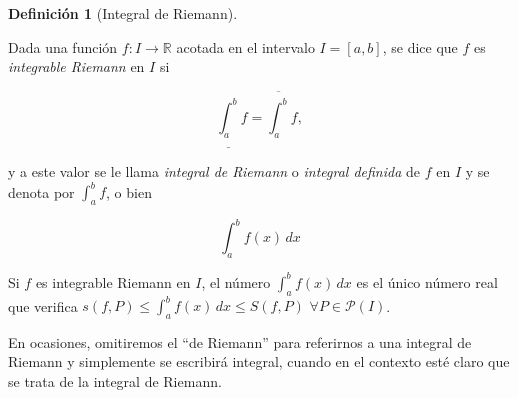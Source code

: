 \documentclass[
  a4paper,
]{scrreport}
\theoremstyle{definition}
\theoremstyle{plain}
\theoremstyle{definition}
\newtheorem{definition}{Definición}[chapter]
\theoremstyle{definition}
\theoremstyle{plain}
\theoremstyle{plain}
\theoremstyle{remark}
\begin{document}
\begin{definition}[Integral de
Riemann]\protect\hypertarget{def-integral-riemann}{}\label{def-integral-riemann}

Dada una función \(f:I\to\mathbb{R}\) acotada en el intervalo
\(I=[a,b]\), se dice que \(f\) es \emph{integrable Riemann} en \(I\) si

\[
\underline{\int_a^b} f = \overline{\int_a^b}f,
\]

y a este valor se le llama \emph{integral de Riemann} o \emph{integral
definida} de \(f\) en \(I\) y se denota por \(\int_a^b f\), o bien

\[
\int_a^b f(x)\,dx
\]

\end{definition}

\begin{tcolorbox}[enhanced jigsaw, leftrule=.75mm, colbacktitle=quarto-callout-note-color!10!white, toprule=.15mm, opacityback=0, opacitybacktitle=0.6, toptitle=1mm, breakable, bottomtitle=1mm, colframe=quarto-callout-note-color-frame, rightrule=.15mm, titlerule=0mm, title=\textcolor{quarto-callout-note-color}{\faInfo}\hspace{0.5em}{Nota}, arc=.35mm, left=2mm, bottomrule=.15mm, colback=white, coltitle=black]

Si \(f\) es integrable Riemann en \(I\), el número \(\int_a^b f(x)\,dx\)
es el único número real que verifica
\(s(f,P)\leq \int_a^b f(x)\,dx\leq S(f,P)\)
\(\forall P\in\mathcal{P}(I)\).

\end{tcolorbox}

En ocasiones, omitiremos el ``de Riemann'' para referirnos a una
integral de Riemann y simplemente se escribirá integral, cuando en el
contexto esté claro que se trata de la integral de Riemann.
\end{document}
